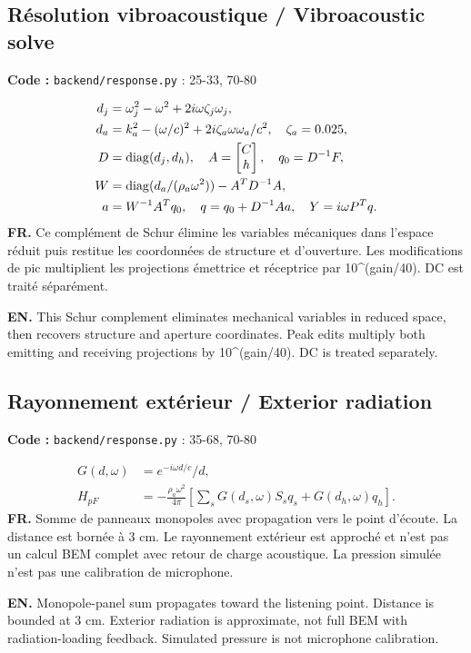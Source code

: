 \documentclass[10pt,a4paper]{article}
\newcommand{\FR}[1]{\textbf{FR.} #1\par}\newcommand{\EN}[1]{{\selectlanguage{english}\textbf{EN.} #1\par}}
\newcommand{\loc}[1]{{\small\color{ink}\textbf{Code :} #1\par}}
\begin{document}
\begin{samepage}\subsection{Résolution vibroacoustique / Vibroacoustic solve}
\loc{\texttt{backend/response.py} : 25-33, 70-80}
\begin{align}d_j&=\omega_j^2-\omega^2+2i\omega\zeta_j\omega_j,\\
d_a&=k_a^2-(\omega/c)^2+2i\zeta_a\omega\omega_a/c^2,\quad\zeta_a=0.025,\\
D&=\operatorname{diag}(d_j,d_h),\quad A=\begin{bmatrix}C\\h\end{bmatrix},\quad q_0=D^{-1}F,\\
W&=\operatorname{diag}(d_a/(\rho_a\omega^2))-A^TD^{-1}A,\\
a&=W^{-1}A^Tq_0,\quad q=q_0+D^{-1}Aa,\quad Y=i\omega P^Tq.\end{align}
\FR{Ce complément de Schur élimine les variables mécaniques dans l’espace réduit puis restitue les coordonnées de structure et d’ouverture. Les modifications de pic multiplient les projections émettrice et réceptrice par 10\textasciicircum{}(gain/40). DC est traité séparément.}
\EN{This Schur complement eliminates mechanical variables in reduced space, then recovers structure and aperture coordinates. Peak edits multiply both emitting and receiving projections by 10\textasciicircum{}(gain/40). DC is treated separately.}
\end{samepage}
\begin{samepage}\subsection{Rayonnement extérieur / Exterior radiation}
\loc{\texttt{backend/response.py} : 35-68, 70-80}
\begin{align}G(d,\omega)&=e^{-i\omega d/c}/d,\\
H_{pF}&=-\frac{\rho_a\omega^2}{4\pi}\left[\sum_sG(d_s,\omega)S_s q_s+G(d_h,\omega)q_h\right].\end{align}
\FR{Somme de panneaux monopoles avec propagation vers le point d’écoute. La distance est bornée à 3 cm. Le rayonnement extérieur est approché et n’est pas un calcul BEM complet avec retour de charge acoustique. La pression simulée n’est pas une calibration de microphone.}
\EN{Monopole-panel sum propagates toward the listening point. Distance is bounded at 3 cm. Exterior radiation is approximate, not full BEM with radiation-loading feedback. Simulated pressure is not microphone calibration.}
\end{samepage}
\end{document}
